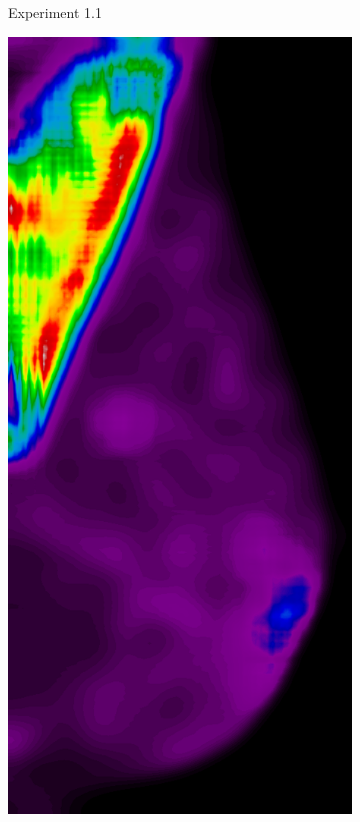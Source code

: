 \begin{figure}[h!]
\begin{subfigure}{0.195\textwidth}
		\caption{Experiment 1.1}
    \end{subfigure}
	\begin{subfigure}{0.195\textwidth}
		\centering
			\includegraphics[width=\textwidth]{plots/examples/example4_probs_1_2.png}

\end{subfigure}
\end{figure}
